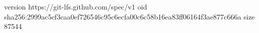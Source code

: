 version https://git-lfs.github.com/spec/v1
oid sha256:2999ac5cf3caa0ef726546c95c6ecfa00c6c58b16ea83ff06164f3ae877c666a
size 87544
